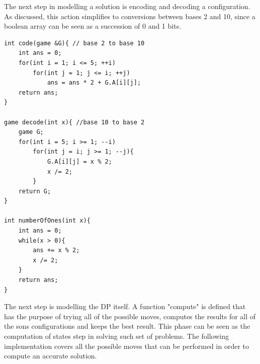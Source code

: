 \documentclass[letterpaper]{article}
\begin{document}
The next step in modelling a solution is encoding and decoding a configuration. As discussed, this action simplifies to conversions between bases 2 and 10, since a boolean array can be seen as a succession of 0 and 1 bits.

\begin{lstlisting}
int code(game &G){ // base 2 to base 10
    int ans = 0;
    for(int i = 1; i <= 5; ++i)
        for(int j = 1; j <= i; ++j)
            ans = ans * 2 + G.A[i][j];
    return ans;
}

game decode(int x){ //base 10 to base 2
    game G;
    for(int i = 5; i >= 1; --i)
        for(int j = i; j >= 1; --j){
            G.A[i][j] = x % 2;
            x /= 2;
        }
    return G;
}

int numberOfOnes(int x){
    int ans = 0;
    while(x > 0){
        ans += x % 2;
        x /= 2;
    }
    return ans;
}
\end{lstlisting}

The next step is modelling the DP itself. A function "compute" is defined that has the purpose of trying all of the possible moves, computes the results for all of the sons configurations and keeps the best result. This phase can be seen as the computation of states step in solving such set of problems. The following implementation covers all the possible moves that can be performed in order to compute an accurate solution.
\end{document}
